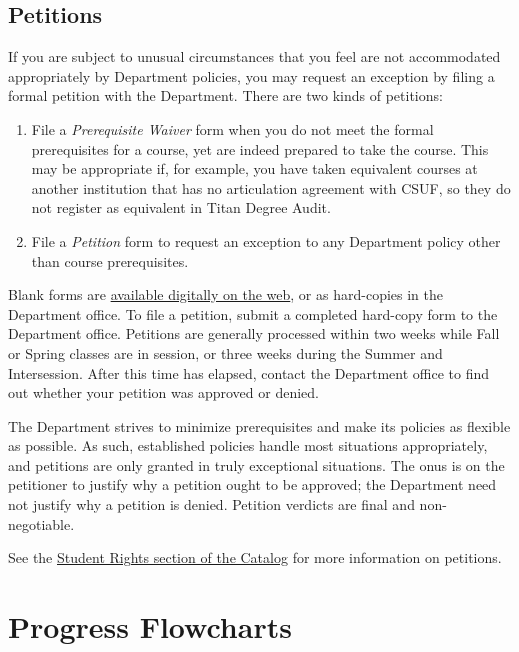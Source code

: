 \documentclass{book}
\newcommand{\campusname}{CSUF}
\begin{document}
\section{Petitions}
\label{section:petitions}

If you are subject to unusual circumstances that you feel are not accommodated appropriately by Department policies, you may request an exception by filing a formal petition with the Department. There are two kinds of petitions:
\begin{enumerate}
\item File a \emph{Prerequisite Waiver} form when you do not meet the formal prerequisites for a course, yet are indeed prepared to take the course. This may be appropriate if, for example, you have taken equivalent courses at another institution that has no articulation agreement with \campusname, so they do not register as equivalent in Titan Degree Audit.
\item File a \emph{Petition} form to request an exception to any Department policy other than course prerequisites.
\end{enumerate}

Blank forms are \href{http://fullerton.edu/ecs/cs/resources/formsDocuments.asp}{available digitally on the web}, or as hard-copies in the Department office. To file a petition, submit a completed hard-copy form to the Department office. Petitions are generally processed within two weeks while Fall or Spring classes are in session, or three weeks during the Summer and Intersession. After this time has elapsed, contact the Department office to find out whether your petition was approved or denied.

The Department strives to minimize prerequisites and make its policies as flexible as possible. As such, established policies handle most situations appropriately, and petitions are only granted in truly exceptional situations. The onus is on the petitioner to justify why a petition ought to be approved; the Department need not justify why a petition is denied. Petition verdicts are final and non-negotiable.

See the \href{http://catalog.fullerton.edu/content.php?catoid=2&navoid=115#Student_Rights}{Student Rights section of the Catalog} for more information on petitions.

\chapter{Progress Flowcharts}
\end{document}
